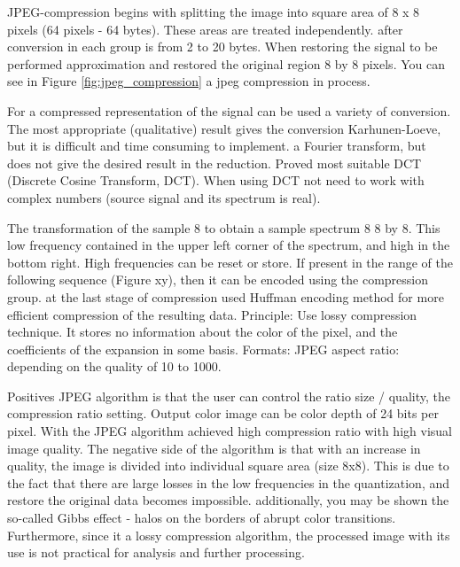 JPEG-compression begins with splitting the image into square area of 8 x 8 pixels (64 pixels - 64 bytes). These areas are treated independently. after conversion in each group is from 2 to 20 bytes. When restoring the signal to be performed approximation and restored the original region 8 by 8 pixels. You can see in Figure \ref{fig:jpeg_compression} a jpeg compression in process.

For a compressed representation of the signal can be used a variety of conversion. The most appropriate (qualitative) result gives the conversion Karhunen-Loeve, but it is difficult and time consuming to implement. a Fourier transform, but does not give the desired result in the reduction. Proved most suitable DCT (Discrete Cosine Transform, DCT). When using DCT not need to work with complex numbers (source signal and its spectrum is real).

The transformation of the sample 8 to obtain a sample spectrum 8 8 by 8. This low frequency contained in the upper left corner of the spectrum, and high in the bottom right. High frequencies can be reset or store. If present in the range of the following sequence (Figure xy), then it can be encoded using the compression group. at the last stage of compression used Huffman encoding method for more efficient compression of the resulting data. Principle: Use lossy compression technique. It stores no information about the color of the pixel, and the coefficients of the expansion in some basis. Formats: JPEG 
aspect ratio: depending on the quality of 10 to 1000.


Positives JPEG algorithm is that the user can control the ratio size / quality, the compression ratio setting. Output color image can be color depth of 24 bits per pixel. With the JPEG algorithm achieved high compression ratio with high visual image quality. The negative side of the algorithm is that with an increase in quality, the image is divided into individual square area (size 8x8). This is due to the fact that there are large losses in the low frequencies in the quantization, and restore the original data becomes impossible. additionally, you may be shown the so-called Gibbs effect - halos on the borders of abrupt color transitions. Furthermore, since it a lossy compression algorithm, the processed image with its use is not practical for analysis and further processing.


